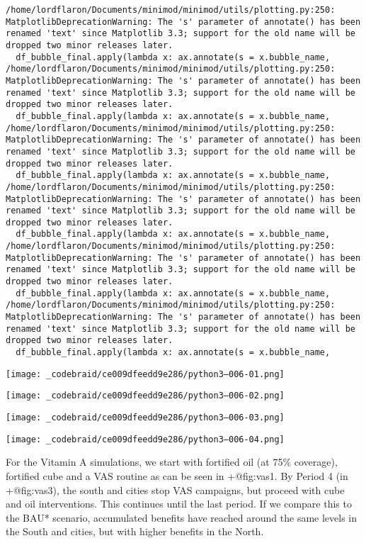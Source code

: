 \documentclass[
]{article}
\begin{document}
\begin{verbatim}
/home/lordflaron/Documents/minimod/minimod/utils/plotting.py:250: MatplotlibDeprecationWarning: The 's' parameter of annotate() has been renamed 'text' since Matplotlib 3.3; support for the old name will be dropped two minor releases later.
  df_bubble_final.apply(lambda x: ax.annotate(s = x.bubble_name,
/home/lordflaron/Documents/minimod/minimod/utils/plotting.py:250: MatplotlibDeprecationWarning: The 's' parameter of annotate() has been renamed 'text' since Matplotlib 3.3; support for the old name will be dropped two minor releases later.
  df_bubble_final.apply(lambda x: ax.annotate(s = x.bubble_name,
/home/lordflaron/Documents/minimod/minimod/utils/plotting.py:250: MatplotlibDeprecationWarning: The 's' parameter of annotate() has been renamed 'text' since Matplotlib 3.3; support for the old name will be dropped two minor releases later.
  df_bubble_final.apply(lambda x: ax.annotate(s = x.bubble_name,
/home/lordflaron/Documents/minimod/minimod/utils/plotting.py:250: MatplotlibDeprecationWarning: The 's' parameter of annotate() has been renamed 'text' since Matplotlib 3.3; support for the old name will be dropped two minor releases later.
  df_bubble_final.apply(lambda x: ax.annotate(s = x.bubble_name,
/home/lordflaron/Documents/minimod/minimod/utils/plotting.py:250: MatplotlibDeprecationWarning: The 's' parameter of annotate() has been renamed 'text' since Matplotlib 3.3; support for the old name will be dropped two minor releases later.
  df_bubble_final.apply(lambda x: ax.annotate(s = x.bubble_name,
/home/lordflaron/Documents/minimod/minimod/utils/plotting.py:250: MatplotlibDeprecationWarning: The 's' parameter of annotate() has been renamed 'text' since Matplotlib 3.3; support for the old name will be dropped two minor releases later.
  df_bubble_final.apply(lambda x: ax.annotate(s = x.bubble_name,
\end{verbatim}

\texttt{[image: \_codebraid/ce009dfeedd9e286/python3--006-01.png]}

\texttt{[image: \_codebraid/ce009dfeedd9e286/python3--006-02.png]}

\texttt{[image: \_codebraid/ce009dfeedd9e286/python3--006-03.png]}

\texttt{[image: \_codebraid/ce009dfeedd9e286/python3--006-04.png]}

For the Vitamin A simulations, we start with fortified oil (at 75\%
coverage), fortified cube and a VAS routine as can be seen in
+@fig:vas1. By Period 4 (in +@fig:vas3), the south and cities stop VAS
campaigns, but proceed with cube and oil interventions. This continues
until the last period. If we compare this to the BAU* scenario,
accumulated benefits have reached around the same levels in the South
and cities, but with higher benefits in the North.
\end{document}
